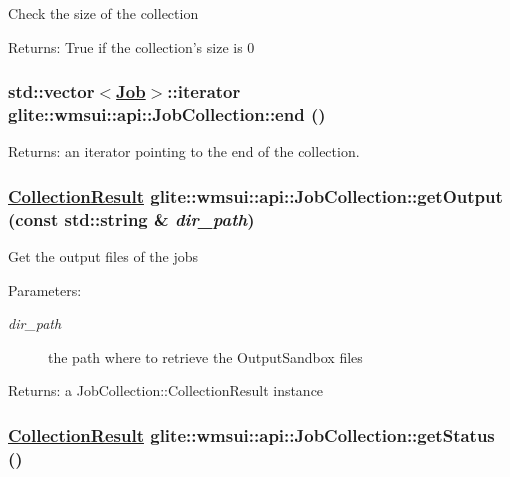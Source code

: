 Check the size of the collection \begin{Desc}
\item[Returns:]True if the collection's size is 0 \end{Desc}
\hypertarget{classglite_1_1wmsui_1_1api_1_1JobCollection_z5_1}{
\subsubsection[end]{\setlength{\rightskip}{0pt plus 5cm}std::vector$<$\hyperlink{classglite_1_1wmsui_1_1api_1_1Job}{Job}$>$::iterator glite::wmsui::api::Job\-Collection::end ()}}
\label{classglite_1_1wmsui_1_1api_1_1JobCollection_z5_1}


\begin{Desc}
\item[Returns:]an iterator pointing to the end of the collection. \end{Desc}
\hypertarget{classglite_1_1wmsui_1_1api_1_1JobCollection_z7_3}{
\subsubsection[getOutput]{\setlength{\rightskip}{0pt plus 5cm}\hyperlink{structglite_1_1wmsui_1_1api_1_1CollectionResult}{Collection\-Result} glite::wmsui::api::Job\-Collection::get\-Output (const std::string \& {\em dir\_\-path})}}
\label{classglite_1_1wmsui_1_1api_1_1JobCollection_z7_3}


Get the output files of the jobs \begin{Desc}
\item[Parameters:]
\begin{description}
\item[{\em dir\_\-path}]the path where to retrieve the Output\-Sandbox files \end{description}
\end{Desc}
\begin{Desc}
\item[Returns:]a Job\-Collection::Collection\-Result instance \end{Desc}
\hypertarget{classglite_1_1wmsui_1_1api_1_1JobCollection_z7_2}{
\subsubsection[getStatus]{\setlength{\rightskip}{0pt plus 5cm}\hyperlink{structglite_1_1wmsui_1_1api_1_1CollectionResult}{Collection\-Result} glite::wmsui::api::Job\-Collection::get\-Status ()}}
\label{classglite_1_1wmsui_1_1api_1_1JobCollection_z7_2}


